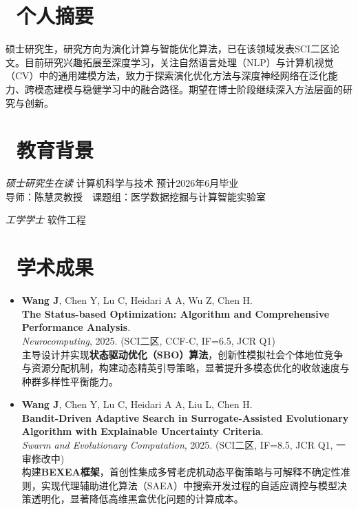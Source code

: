 \documentclass{resume}
\begin{document}
\vspace{0.4cm} 

\section{\faInfoCircle\ 个人摘要}
硕士研究生，研究方向为演化计算与智能优化算法，已在该领域发表SCI二区论文。目前研究兴趣拓展至深度学习，关注自然语言处理（NLP）与计算机视觉（CV）中的通用建模方法，致力于探索演化优化方法与深度神经网络在泛化能力、跨模态建模与稳健学习中的融合路径。期望在博士阶段继续深入方法层面的研究与创新。

\section{\faGraduationCap\ 教育背景}
\textit{硕士研究生在读} \quad 计算机科学与技术 \quad 预计2026年6月毕业\\
导师：陈慧灵教授 课题组：医学数据挖掘与计算智能实验室

\textit{工学学士} \quad 软件工程

\section{\faFileTextO\ 学术成果}
\begin{itemize}
  \item \textbf{Wang J}, Chen Y, Lu C, Heidari A A, Wu Z, Chen H.\\
  \textbf{The Status-based Optimization: Algorithm and Comprehensive Performance Analysis}.\\
  \textit{Neurocomputing}, 2025. (SCI二区, CCF-C, IF=6.5, JCR Q1)\\
  主导设计并实现\textbf{状态驱动优化（SBO）算法}，创新性模拟社会个体地位竞争与资源分配机制，构建动态精英引导策略，显著提升多模态优化的收敛速度与种群多样性平衡能力。
  \item \textbf{Wang J}, Chen Y, Lu C, Heidari A A, Liu L, Chen H.\\
  \textbf{Bandit-Driven Adaptive Search in Surrogate-Assisted Evolutionary Algorithm with Explainable Uncertainty Criteria}.\\
  \textit{Swarm and Evolutionary Computation}, 2025. (SCI二区, IF=8.5, JCR Q1, 一审修改中)\\
  构建\textbf{BEXEA框架}，首创性集成多臂老虎机动态平衡策略与可解释不确定性准则，实现代理辅助进化算法（SAEA）中搜索开发过程的自适应调控与模型决策透明化，显著降低高维黑盒优化问题的计算成本。
\end{itemize}
\end{document}
